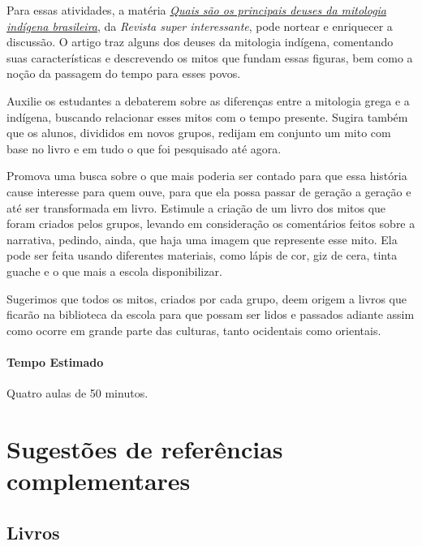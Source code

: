 \documentclass[11pt]{extarticle}
\begin{document}
Para essas atividades, a matéria \href{https://super.abril.com.br/mundo-estranho/quais-sao-os-principais-deuses-da-mitologia-indigena-brasileira/}{\textit{Quais são os principais deuses da mitologia indígena brasileira}}, da \textit{Revista super interessante}, pode nortear e enriquecer a discussão. O artigo traz alguns dos deuses da mitologia indígena, comentando suas características e descrevendo os mitos que fundam essas figuras, bem como a noção da passagem do tempo para esses povos. 

Auxilie os estudantes a debaterem sobre as diferenças entre a mitologia grega e a indígena, buscando relacionar esses mitos com o tempo presente. Sugira também que os alunos, divididos em novos grupos, redijam em conjunto um mito com base no livro e em tudo o que foi pesquisado até agora. 

Promova uma busca sobre o que mais poderia ser contado para que essa história cause interesse para quem ouve, para que ela possa passar de geração a geração e até ser transformada em livro. Estimule a criação de um livro dos mitos que foram criados pelos grupos, levando em consideração os comentários feitos sobre a narrativa, pedindo, ainda, que haja uma imagem que represente esse mito. Ela pode ser feita usando diferentes materiais, como lápis de cor, giz de cera, tinta guache e o que mais a escola disponibilizar. 

Sugerimos que todos os mitos, criados por cada grupo, deem origem a  livros que ficarão na biblioteca da escola para que possam ser lidos e passados adiante assim como ocorre em grande parte das culturas, tanto ocidentais como orientais.

\paragraph{Tempo Estimado} Quatro aulas de 50 minutos.



\section{Sugestões de referências complementares}

\subsection{Livros} 
\end{document}
